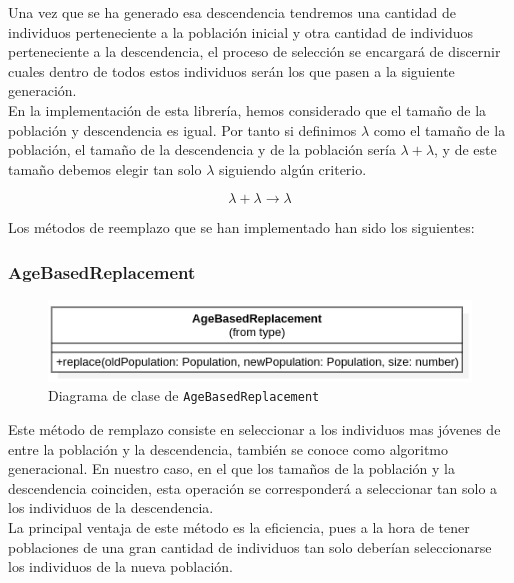 Una vez que se ha generado esa descendencia tendremos una cantidad de individuos perteneciente a la población inicial y otra cantidad de individuos perteneciente a la descendencia, el proceso de selección se encargará de discernir cuales dentro de todos estos individuos serán los que pasen a la siguiente generación. \\

En la implementación de esta librería, hemos considerado que el tamaño de la población y descendencia es igual. Por tanto si definimos $\lambda$ como el tamaño de la población, el tamaño de la descendencia y de la población sería $\lambda + \lambda$, y de este tamaño debemos elegir tan solo $\lambda$ siguiendo algún criterio.

\begin{equation}
    \lambda + \lambda \rightarrow \lambda
\end{equation}

Los métodos de reemplazo que se han implementado han sido los siguientes:

\subsubsection{AgeBasedReplacement}

\begin{figure}[ht]
    \centering
    \includegraphics[scale=0.5]{mem/images/cap-4/4.2.8(Reemplazo)/AgeBasedReplacement.png}
    \caption{Diagrama de clase de \texttt{AgeBasedReplacement}}
    \label{fig:my_label}
\end{figure}

Este método de remplazo consiste en seleccionar a los individuos mas jóvenes de entre la población y la descendencia, también se conoce como algoritmo generacional. En nuestro caso, en el que los tamaños de la población y la descendencia coinciden, esta operación se corresponderá a seleccionar tan solo a los individuos de la descendencia. \\

La principal ventaja de este método es la eficiencia, pues a la hora de tener poblaciones de una gran cantidad de individuos tan solo deberían seleccionarse los individuos de la nueva población. \\


